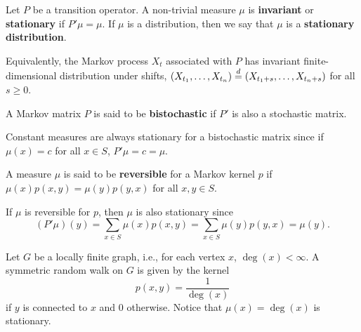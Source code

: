 \begin{definition}
    Let $P$ be a transition operator. A non-trivial measure $\mu$ is 
    \textbf{invariant} or \textbf{stationary} if $P'\mu = \mu$. If $\mu$ 
    is a distribution, then we say that $\mu$ is a \textbf{stationary distribution}. 
\end{definition}
\begin{remark}
    Equivalently, the Markov process $X_t$ associated with $P$ has invariant 
    finite-dimensional distribution under shifts, $(X_{t_1},\ldots,X_{t_n}) 
    \stackrel{d}{=} (X_{t_1+s},\ldots,X_{t_n+s})$ for all $s\geq 0$. 
\end{remark}

\begin{definition}
    A Markov matrix $P$ is said to be \textbf{bistochastic} if $P'$ is also 
    a stochastic matrix.  
\end{definition}
\begin{remark}
    Constant measures are always stationary for a bistochastic matrix 
    since if $\mu(x) = c$ for all $x\in S$, $P'\mu = c = \mu$. 
\end{remark}

\begin{definition}
    A measure $\mu$ is said to be \textbf{reversible} for a Markov kernel $p$ 
    if $\mu(x)p(x,y) = \mu(y)p(y,x)$ for all $x,y\in S$. 
\end{definition}
\begin{remark}
    If $\mu$ is reversible for $p$, then $\mu$ is also stationary since 
    \begin{equation*}
        (P'\mu)(y) = \sum_{x\in S}\mu(x)p(x,y) = \sum_{x\in S}\mu(y)p(y,x) 
        = \mu(y).
    \end{equation*}
\end{remark}

\begin{example}
    Let $G$ be a locally finite graph, i.e., for each vertex $x$, 
    $\deg(x)<\infty$. A symmetric random walk on $G$ is given by the 
    kernel 
    \begin{equation*}
        p(x,y) = \frac{1}{\deg(x)}
    \end{equation*} 
    if $y$ is connected to $x$ and $0$ otherwise. Notice that 
    $\mu(x) = \deg(x)$ is stationary.  
\end{example}


